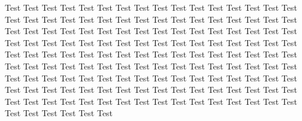 \documentclass{book*}
\begin{document}
Test Test Test Test Test Test Test Test Test Test Test Test Test Test Test Test Test Test Test Test Test Test Test Test Test
Test Test Test Test Test Test Test Test Test Test Test Test Test Test Test Test Test Test Test Test Test Test Test Test Test
Test Test Test Test Test Test Test Test Test Test Test Test Test Test Test Test Test Test Test Test Test Test Test Test Test
Test Test Test Test Test Test Test Test Test Test Test Test Test Test Test Test Test Test Test Test Test Test Test Test Test
Test Test Test Test Test Test Test Test Test Test Test Test Test Test Test Test Test Test Test Test Test Test Test Test Test
Test Test Test Test Test Test Test Test Test Test Test Test Test Test Test Test Test Test Test Test Test Test Test Test Test
\end{document}
